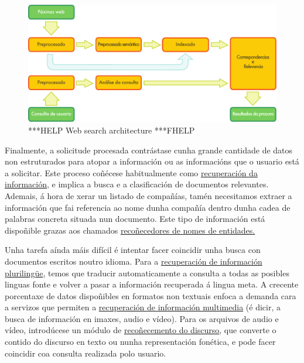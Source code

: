 \begin{multicols}{2}
\begin{figure}[htb]
  \vspace{-9mm}
  \center
  \includegraphics[width=\textwidth]{../_media/galician/web_search_architecture}
  \vspace{-5mm}
  \caption{***HELP Web search architecture ***FHELP}
  \label{fig:websearcharch_ga}
\end{figure}

Finalmente, a solicitude procesada contrástase cunha grande cantidade de datos non estruturados para atopar a información ou as informacións que o usuario está a solicitar. Este proceso coñécese habitualmente como \uline{recuperación da información}, e implica a busca e a clasificación de documentos relevantes. Ademais, á hora de xerar un listado de compañías, tamén necesitamos extraer a información que fai referencia ao nome dunha compañía dentro dunha cadea de palabras concreta situada nun documento. Este tipo de información está dispoñible grazas aos chamados \uline{recoñecedores de nomes de entidades.} 

Unha tarefa aínda máis difícil é intentar facer coincidir unha busca con documentos escritos noutro idioma. Para a \uline{recuperación de información plurilingüe}, temos que traducir automaticamente a consulta a todas as posibles linguas fonte e volver a pasar a información recuperada á lingua meta. A crecente porcentaxe de datos dispoñibles en formatos non textuais enfoca a demanda cara a servizos que permiten a \uline{recuperación de información multimedia} (é dicir, a busca de información en imaxes, audio e vídeo). Para os arquivos de audio e vídeo, introdúcese un módulo de \uline{recoñecemento do discurso}, que converte o contido do discurso en texto ou nunha representación fonética, e pode facer coincidir coa consulta realizada polo usuario.





\end{multicols}
